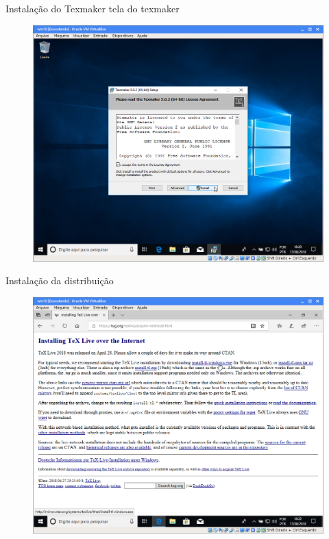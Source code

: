 \documentclass{beamer}
\begin{document}
\begin{frame}{Instala\c{c}\~ao do Texmaker}
    tela do texmaker
    \begin{figure}[h]
        \includegraphics[scale=0.25]{fig/texmaker-01.png}
    \end{figure}
\end{frame}

\begin{frame}{Instala\c{c}\~ao da distribui\c{c}\~ao}
    \begin{figure}[h]
        \includegraphics[scale=0.25]{fig/texlive-site.png}
    \end{figure}
\end{frame}
\end{document}
